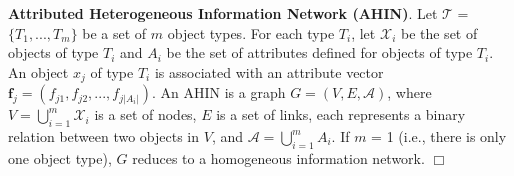 {\begin{table}
\begin{tabular}{|c|l|}
%   
\end{tabular}
\label{table:symbol}
\end{table}
}



\begin{definition}
\label{def:ahin}
\textbf{Attributed Heterogeneous Information Network (AHIN)}. 
Let $\mathcal{T}$ = $\{T_1, ..., T_m \}$ be a set of $m$ object types.
For each type $T_i$, 
let $\mathcal{X}_i$ be the set of objects of type $T_i$
and $A_i$ be the set of attributes defined for objects of type $T_i$.
An object $x_j$ of type $T_i$ is associated with an attribute vector
$\bm f_{j} = (f_{j1}, f_{j2}, ..., f_{j|A_i|})$.
An AHIN is a graph $G = (V, E, \mathcal{A})$, where
$V = \bigcup_{i=1}^m\mathcal{X}_i$ is a set of nodes,
$E$ is a set of links, each represents a binary relation between two objects in $V$,
and $\mathcal{A} = \bigcup_{i=1}^m{A_i}$.
If $m$ = 1 (i.e., there is only one object type), $G$ reduces to a homogeneous information network.
\hfill$\Box$
\end{definition}

